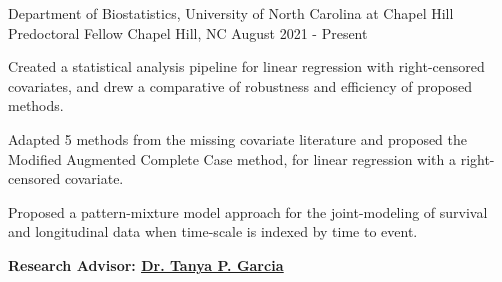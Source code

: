 

\begin{cventries}


    \cventry
    {Department of Biostatistics, University of North Carolina at Chapel Hill} %
    {Predoctoral Fellow} %
    {Chapel Hill, NC} %
    {August 2021 - Present} %
    {
      \begin{cvitems} %
        \item Created a statistical analysis pipeline for linear regression with right-censored covariates, and drew a comparative of \newline robustness and efficiency of proposed methods.
        \item Adapted 5 methods from the missing covariate literature and proposed the Modified Augmented Complete Case method, \newline for linear regression with a right-censored covariate.
        \item Proposed a pattern-mixture model approach for the joint-modeling of survival and longitudinal data \newline when time-scale is indexed by time to event.
        \item  \textbf{Research Advisor:
\href{https://tpgarcia.github.io}{\underline{Dr. Tanya P. Garcia}}}
      \end{cvitems}
    }
    

\end{cventries}
